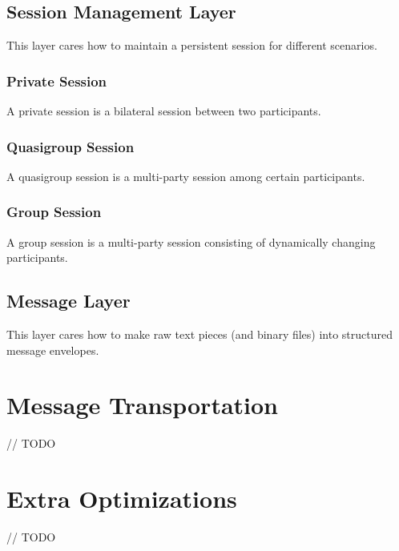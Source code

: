 
\subsection{Session Management Layer}

This layer cares how to maintain a persistent session for different scenarios.

\subsubsection{Private Session}

A private session is a bilateral session between two participants.

\subsubsection{Quasigroup Session}

A quasigroup session is a multi-party session among certain participants.

\subsubsection{Group Session}

A group session is a multi-party session consisting of dynamically changing participants.

\subsection{Message Layer}

This layer cares how to make raw text pieces (and binary files) into structured message envelopes.










\section{Message Transportation}

// TODO










\section{Extra Optimizations}

// TODO











